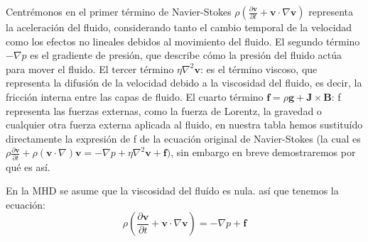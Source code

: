 \documentclass[article,12pt]{elsarticle}
\begin{document}
    Centrémonos en el primer término de Navier-Stokes $\rho \left( \frac{\partial \mathbf{v}}{\partial t} + \mathbf{v} \cdot \nabla \mathbf{v} \right)$ representa la aceleración del fluido, considerando tanto el cambio temporal de la velocidad como los efectos no lineales debidos al movimiento del fluido. El segundo término $-\nabla p$ es el gradiente de presión, que describe cómo la presión del fluido actúa para mover el fluido. El tercer término $\eta \nabla^2 \mathbf{v}$: es el término viscoso, que representa la difusión de la velocidad debido a la viscosidad del fluido, es decir, la fricción interna entre las capas de fluido. El cuarto término $\mathbf{f} =\rho \mathbf{g} + \mathbf{J} \times \mathbf{B}$: f representa las fuerzas externas, como la fuerza de Lorentz, la gravedad o cualquier otra fuerza externa aplicada al fluido, en nuestra tabla hemos sustituído directamente la expresión de f de la ecuación original de Navier-Stokes (la cual es $\rho \frac{\partial \mathbf{v}}{\partial t} + \rho (\mathbf{v} \cdot \nabla) \mathbf{v} = -\nabla p + \eta \nabla^2 \mathbf{v} + \textbf{f})$, sin embargo en breve demostraremos por qué es así.
    
    En la MHD se asume que la viscosidad del fluído es nula. así que tenemos la ecuación:
    \begin{equation}
    \rho \left( \frac{\partial \mathbf{v}}{\partial t} + \mathbf{v} \cdot \nabla \mathbf{v} \right) = -\nabla p + \textbf{f}
    \end{equation}
\end{document}

